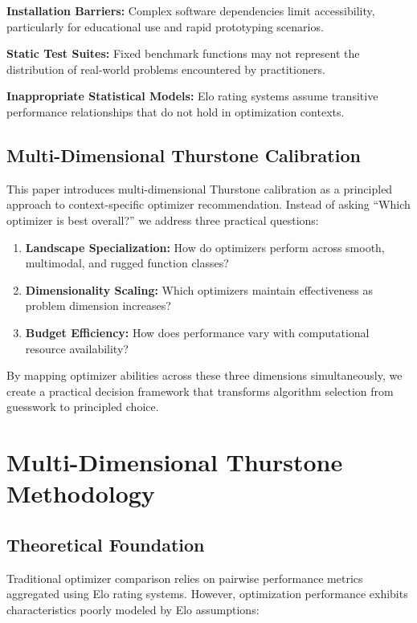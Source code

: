 \documentclass[article]{jss}
\begin{document}
\textbf{Installation Barriers:} Complex software dependencies limit accessibility, particularly for educational use and rapid prototyping scenarios.

\textbf{Static Test Suites:} Fixed benchmark functions may not represent the distribution of real-world problems encountered by practitioners.

\textbf{Inappropriate Statistical Models:} Elo rating systems assume transitive performance relationships that do not hold in optimization contexts.

\subsection{Multi-Dimensional Thurstone Calibration}

This paper introduces multi-dimensional Thurstone calibration as a principled approach to context-specific optimizer recommendation. Instead of asking ``Which optimizer is best overall?'' we address three practical questions:

\begin{enumerate}
\item \textbf{Landscape Specialization:} How do optimizers perform across smooth, multimodal, and rugged function classes?
\item \textbf{Dimensionality Scaling:} Which optimizers maintain effectiveness as problem dimension increases?
\item \textbf{Budget Efficiency:} How does performance vary with computational resource availability?
\end{enumerate}

By mapping optimizer abilities across these three dimensions simultaneously, we create a practical decision framework that transforms algorithm selection from guesswork to principled choice.

\section{Multi-Dimensional Thurstone Methodology} \label{sec:methods}

\subsection{Theoretical Foundation}

Traditional optimizer comparison relies on pairwise performance metrics aggregated using Elo rating systems. However, optimization performance exhibits characteristics poorly modeled by Elo assumptions:
\end{document}
